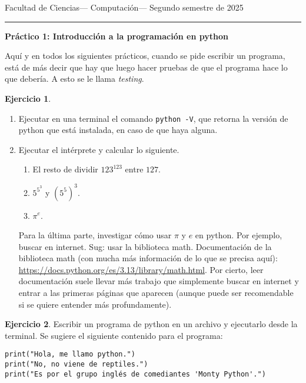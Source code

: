 \documentclass[a4paper,12pt]{book}
\theoremstyle{definition}
\newtheorem{ejercicio}{Ejercicio}
\begin{document}
	
	\noindent
	\centerline{\sc
		Facultad de Ciencias\hfill---\hfill
		Computación\hfill---\hfill
		Segundo semestre de 2025}\smallbreak\hrule
	
	\bigbreak
	\centerline{\Large\textbf{Práctico 1: Introducción a la programación en python}}
	\bigbreak
	
	Aquí y en todos los siguientes prácticos, cuando se pide escribir un programa, está de más decir que hay que luego hacer pruebas de que el programa hace lo que debería. A esto se le llama {\sl testing}.
	
	\begin{ejercicio}
		\begin{enumerate}
			\item Ejecutar en una terminal el comando {\tt python -V}, que retorna la versión de python que está instalada, en caso de que haya alguna.
			\item Ejecutar el intérprete y calcular lo siguiente.
			\begin{enumerate}\parskip-.5ex
				\item El resto de dividir $123^{123}$ entre $127$.
				\item $5^{5^3}$ y $(5^5)^3$.
				\item $\pi^e$.
			\end{enumerate}
			Para la última parte, investigar cómo usar $\pi$ y $e$ en python. Por ejemplo, buscar en internet. Sug: usar la biblioteca math. Documentación de la biblioteca math (con mucha más información de lo que se precisa aquí): \href{https://docs.python.org/es/3.13/library/math.html}{https://docs.python.org/es/3.13/library/math.html}. Por cierto, leer documentación suele llevar más trabajo que simplemente buscar en internet y entrar a las primeras páginas que aparecen (aunque puede ser recomendable si se quiere entender más profundamente).
		\end{enumerate}
		
		
	\end{ejercicio}
	\begin{ejercicio}
		Escribir un programa de python en un archivo y ejecutarlo desde la terminal. Se sugiere el siguiente contenido para el programa:
		\begin{verbatim}
print("Hola, me llamo python.")
print("No, no viene de reptiles.")
print("Es por el grupo inglés de comediantes 'Monty Python'.")
		\end{verbatim}
	\end{ejercicio}
	
\end{document}
